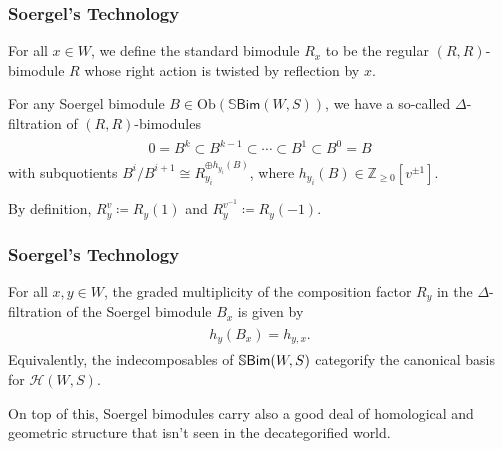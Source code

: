 \documentclass{beamer}
\newcommand{\obset}{\mathrm{Ob}}
\newcommand{\textcat}[1]{\mathrm{\textsf{#1}}}
\begin{document}
\begin{frame}
\frametitle{Soergel's Technology}
\noindent For all $x \in W$, we define the \textcolor{structure}{standard bimodule} $R_x$ to be the regular $(R, R)$-bimodule $R$ whose right action is twisted by reflection by $x$.\newline %

\noindent For any Soergel bimodule $B \in \obset(\mathbb{S}\textcat{Bim}(W, S))$, we have a so-called \textcolor{structure}{$\Delta$-filtration} of $(R, R)$-bimodules
\begin{align*}
\begin{split}
0 = B^k \subset B^{k-1} \subset \cdots \subset B^1 \subset B^0 = B
\end{split}
\end{align*}
\noindent with subquotients $B^i/B^{i+1} \cong R_{y_i}^{\oplus h_{y_i}(B)}$, where $h_{y_i}(B) \in \mathbb{Z}_{\geq 0}[v^{\pm 1}]$.\newline

\noindent By definition, $R_y^v \coloneqq R_y(1)$ and $R_y^{v^{-1}} \coloneqq R_y(-1)$.
\end{frame}

\begin{frame}
\frametitle{Soergel's Technology}
\begin{theorem}
\noindent For all $x, y \in W$, the graded multiplicity of the composition factor $R_y$ in the $\Delta$-filtration of the Soergel bimodule $B_x$ is given by
\begin{align*}
\begin{split}
h_y(B_x) = h_{y,x}.
\end{split}
\end{align*}
Equivalently, the indecomposables of $\mathbb{S}\textcat{\textup{Bim}}(W, S)$ categorify the canonical basis for $\mathscr{H}(W, S)$.
\end{theorem}
\vfill
On top of this, Soergel bimodules carry also a good deal of homological and geometric structure that isn't seen in the decategorified world.
\vfill
\end{frame}
\end{document}
